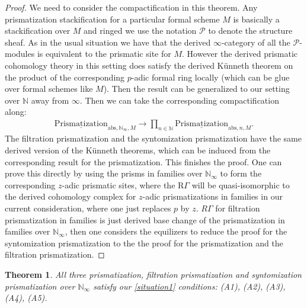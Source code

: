 \documentclass[12pt]{article}
\newtheorem{theorem}{Theorem}
\theoremstyle{definition}
\begin{document}
\begin{proof}
We need to consider the compactification in this theorem. Any prismatization  stackification for a particular formal scheme $M$ is basically a stackification over $M$ and ringed we use the notation $\mathcal{P}$ to denote the structure sheaf. As in the usual situation we have that the derived $\infty$-category of all the $\mathcal{P}$-modules is equivalent to the prismatic site for $M$. However the derived prismatic cohomology theory in this setting does satisfy the derived K\"unneth theorem on the product of the corresponding $p$-adic formal ring locally (which can be glue over formal schemes like $M$). Then the result can be generalized to our setting over $\mathbb{N}$ away from $\infty$. Then we can take the corresponding compactification along:
\begin{align}
{\underline{\mathrm{Prismatization}}}_{\mathrm{abs},\mathbb{N}_\infty,M}\rightarrow  \prod_{n\in \mathbb{N}} {\underline{\mathrm{Prismatization}}}_{\mathrm{abs},n,M}.
\end{align}
The filtration prismatization and the syntomization prismatization have the same derived version of the K\"unneth theorems, which can be induced from the corresponding result for the prismatization. This finishes the proof. One can prove this directly by using the prisms in families over $\mathbb{N}_\infty$ to form the corresponding $z$-adic prismatic sites, where the $\mathrm{R}\Gamma$ will be quasi-isomorphic to the derived cohomology complex for $z$-adic prismatizations in families in our current consideration, where one just replaces $p$ by $z$. $R\Gamma$ for filtration prismatization in families is just derived base change of the prismatization in families over $\mathbb{N}_\infty$, then one considers the equilizers to reduce the proof for the syntomization prismatization to the the proof for the prismatization and the filtration prismatization.
 \end{proof}

\begin{theorem}
All three prismatization, filtration prismatization and syntomization prismatization over $\mathbb{N}_\infty$ satisfy our \cref{situation1} conditions: (A1), (A2), (A3), (A4), (A5).
\end{theorem}
\end{document}
